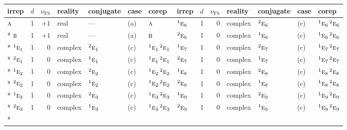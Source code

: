 \documentclass[10pt,a4paper]{article}
\numberwithin{equation}{section}
\newcommand{\irr}[1]{\text{\normalfont\scshape #1}}
\newcommand{\conjpair}[1]{{}^{#1}}
\newcommand{\fsind}{\nu_{\mathrm{FS}}}
\begin{document}
{\small\renewcommand{\arraystretch}{1.25}\setlength{\tabcolsep}{4pt}\begin{longtable}{@{}lrrllll@{\hspace{18pt}}lrrllll@{}}\toprule
irrep & $d$ & $\fsind$ & reality & conjugate & case & corep & irrep & $d$ & $\fsind$ & reality & conjugate & case & corep\\\midrule\endhead
\bottomrule\endfoot\endlastfoot
$\irr{a}$ & 1 & $+1$ & real & --- & (a) & $\irr{a}$ & $\conjpair{1}\irr{e}_{6}$ & 1 & $0$ & complex & $\conjpair{2}\irr{e}_{6}$ & (c) & $\conjpair{1}\irr{e}_{6}\,\conjpair{2}\irr{e}_{6}$\\*
$\irr{b}$ & 1 & $+1$ & real & --- & (a) & $\irr{b}$ & $\conjpair{2}\irr{e}_{6}$ & 1 & $0$ & complex & $\conjpair{1}\irr{e}_{6}$ & (c) & $\conjpair{1}\irr{e}_{6}\,\conjpair{2}\irr{e}_{6}$\\*
$\conjpair{1}\irr{e}_{1}$ & 1 & $0$ & complex & $\conjpair{2}\irr{e}_{1}$ & (c) & $\conjpair{1}\irr{e}_{1}\,\conjpair{2}\irr{e}_{1}$ & $\conjpair{1}\irr{e}_{7}$ & 1 & $0$ & complex & $\conjpair{2}\irr{e}_{7}$ & (c) & $\conjpair{1}\irr{e}_{7}\,\conjpair{2}\irr{e}_{7}$\\*
$\conjpair{2}\irr{e}_{1}$ & 1 & $0$ & complex & $\conjpair{1}\irr{e}_{1}$ & (c) & $\conjpair{1}\irr{e}_{1}\,\conjpair{2}\irr{e}_{1}$ & $\conjpair{2}\irr{e}_{7}$ & 1 & $0$ & complex & $\conjpair{1}\irr{e}_{7}$ & (c) & $\conjpair{1}\irr{e}_{7}\,\conjpair{2}\irr{e}_{7}$\\*
$\conjpair{1}\irr{e}_{2}$ & 1 & $0$ & complex & $\conjpair{2}\irr{e}_{2}$ & (c) & $\conjpair{1}\irr{e}_{2}\,\conjpair{2}\irr{e}_{2}$ & $\conjpair{1}\irr{e}_{8}$ & 1 & $0$ & complex & $\conjpair{2}\irr{e}_{8}$ & (c) & $\conjpair{1}\irr{e}_{8}\,\conjpair{2}\irr{e}_{8}$\\*
$\conjpair{2}\irr{e}_{2}$ & 1 & $0$ & complex & $\conjpair{1}\irr{e}_{2}$ & (c) & $\conjpair{1}\irr{e}_{2}\,\conjpair{2}\irr{e}_{2}$ & $\conjpair{2}\irr{e}_{8}$ & 1 & $0$ & complex & $\conjpair{1}\irr{e}_{8}$ & (c) & $\conjpair{1}\irr{e}_{8}\,\conjpair{2}\irr{e}_{8}$\\*
$\conjpair{1}\irr{e}_{3}$ & 1 & $0$ & complex & $\conjpair{2}\irr{e}_{3}$ & (c) & $\conjpair{1}\irr{e}_{3}\,\conjpair{2}\irr{e}_{3}$ & $\conjpair{1}\irr{e}_{9}$ & 1 & $0$ & complex & $\conjpair{2}\irr{e}_{9}$ & (c) & $\conjpair{1}\irr{e}_{9}\,\conjpair{2}\irr{e}_{9}$\\*
$\conjpair{2}\irr{e}_{3}$ & 1 & $0$ & complex & $\conjpair{1}\irr{e}_{3}$ & (c) & $\conjpair{1}\irr{e}_{3}\,\conjpair{2}\irr{e}_{3}$ & $\conjpair{2}\irr{e}_{9}$ & 1 & $0$ & complex & $\conjpair{1}\irr{e}_{9}$ & (c) & $\conjpair{1}\irr{e}_{9}\,\conjpair{2}\irr{e}_{9}$\\*

\end{longtable}}
\end{document}
